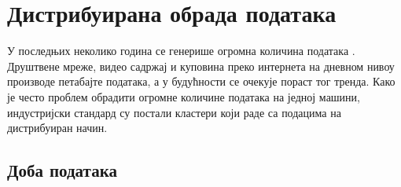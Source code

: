 \documentclass[12pt,oneside]{memoir}
\begin{document}


\chapter{Дистрибуирана обрада података}
\label{chp:dist_sis}

У последњих неколико година се генерише огромна количина података \cite{volume_data}. Друштвене мреже, видео садржај и куповина преко интернета на дневном нивоу производе петабајте података, а у будућности се очекује пораст тог тренда. Како је често проблем обрадити огромне количине података на једној машини, индустријски стандард су постали кластери који раде са подацима на дистрибуиран начин.

\section{Доба података} %
\label{sec:dist_motivacija}
\end{document}
